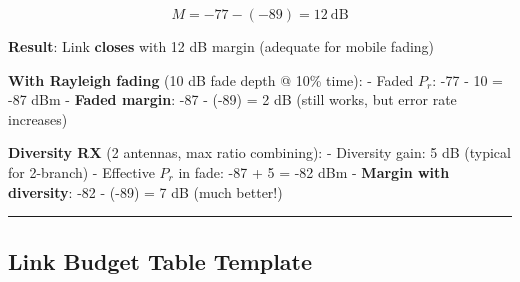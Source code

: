 \[
M = -77 - (-89) = 12\ \text{dB}
\]

\textbf{Result}: Link \textbf{closes} with 12 dB margin (adequate for
mobile fading)

\textbf{With Rayleigh fading} (10 dB fade depth @ 10\% time): - Faded
\(P_r\): -77 - 10 = -87 dBm - \textbf{Faded margin}: -87 - (-89) = 2 dB
(still works, but error rate increases)

\textbf{Diversity RX} (2 antennas, max ratio combining): - Diversity
gain: 5 dB (typical for 2-branch) - Effective \(P_r\) in fade: -87 + 5 =
-82 dBm - \textbf{Margin with diversity}: -82 - (-89) = 7 dB (much
better!)

\begin{center}\rule{0.5\linewidth}{0.5pt}\end{center}

\subsection{Link Budget Table
Template}\label{link-budget-table-template}

